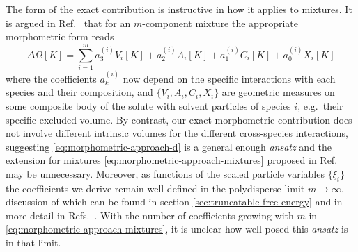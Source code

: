 \documentclass[11pt,twoside]{report}
\def\includebibliography{}
\begin{document}
The form of the exact contribution is instructive in how it applies to mixtures.
It is argued in Ref.\ \cite{KodamaJCP2011} that for an $m$-component mixture the appropriate morphometric form reads
\begin{equation}\label{eq:morphometric-approach-mixtures}
  \Delta \Omega[K]
  =
  \sum_{i=1}^m
  a_3^{(i)} V_i[K]
  + a_2^{(i)} A_i[K]
  + a_1^{(i)} C_i[K]
  + a_0^{(i)} X_i[K]
\end{equation}
where the coefficients $a_k^{(i)}$ now depend on the specific interactions with each species and their composition, and $\{V_i, A_i, C_i, X_i\}$ are geometric measures on some composite body of the solute with solvent particles of species $i$, e.g.\ their specific excluded volume.
By contrast, our exact morphometric contribution does not involve different intrinsic volumes for the different cross-species interactions, suggesting \eqref{eq:morphometric-approach-d} is a general enough \emph{ansatz} and the extension for mixtures \eqref{eq:morphometric-approach-mixtures} proposed in Ref.\ \cite{KodamaJCP2011} may be unnecessary.
Moreover, as functions of the scaled particle variables $\{\xi_i\}$ the coefficients we derive remain well-defined in the polydisperse limit $m \to \infty$, discussion of which can be found in section \ref{sec:truncatable-free-energy} and in more detail in Refs.\ \cite{GualtieriJCP1982,WarrenPRL1998,SollichPRL1998,SollichAiCP2001}.
With the number of coefficients growing with $m$ in \eqref{eq:morphometric-approach-mixtures}, it is unclear how well-posed this \emph{ansatz} is in that limit.

\ifdefined\includebibliography
  \printbibliography
\fi
\end{document}
